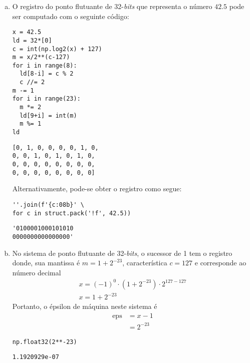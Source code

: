 \begin{resol}
  \begin{enumerate}[a)]
  \item O registro do ponto flutuante de 32-{\it bits} que representa o número $42.5$ pode ser computado com o seguinte código:

\begin{lstlisting}
x = 42.5
ld = 32*[0]
c = int(np.log2(x) + 127)
m = x/2**(c-127)
for i in range(8):
  ld[8-i] = c % 2
  c //= 2
m -= 1
for i in range(23):
  m *= 2
  ld[9+i] = int(m)
  m %= 1
ld
\end{lstlisting}

\begin{verbatim}
[0, 1, 0, 0, 0, 0, 1, 0,
0, 0, 1, 0, 1, 0, 1, 0,
0, 0, 0, 0, 0, 0, 0, 0,
0, 0, 0, 0, 0, 0, 0, 0]
\end{verbatim}

Alternativamente, pode-se obter o registro como segue:

\begin{lstlisting}
''.join(f'{c:08b}' \
for c in struct.pack('!f', 42.5))
\end{lstlisting}

\begin{verbatim}
'0100001000101010
0000000000000000'
\end{verbatim}

  \item No sistema de ponto flutuante de 32-{\it bits}, o sucessor de 1 tem o registro
    \begin{equation}
      [0 ~ | ~ 0 ~ 1 ~ 1 ~ \ldots ~ 1 ~ | ~ 0 ~ 0 ~ \ldots ~ 0 ~ 1]
    \end{equation}
    donde, sua mantissa é $m = 1 + 2^{-23}$, característica $c = 127$ e corresponde ao número decimal
    \begin{gather}
      x = (-1)^0\cdot (1 + 2^{-23})\cdot 2^{127-127}\\
      x = 1 + 2^{-23}
    \end{gather}
    Portanto, o épsilon de máquina neste sistema é
    \begin{align}
      \mathrm{eps} &= x - 1\\
                   &= 2^{-23}
    \end{align}

\begin{lstlisting}
np.float32(2**-23)
\end{lstlisting}

\begin{verbatim}
1.1920929e-07
\end{verbatim}

  \end{enumerate}
\end{resol}

